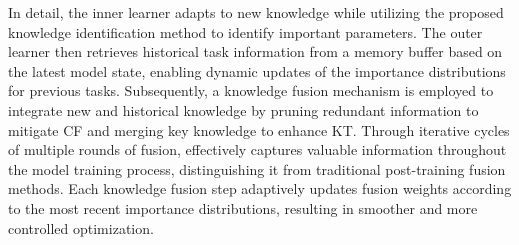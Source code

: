 

In detail, the inner learner adapts to new knowledge while utilizing the proposed knowledge identification method to identify important parameters. The outer learner then retrieves historical task information from a memory buffer based on the latest model state, enabling dynamic updates of the importance distributions for previous tasks. Subsequently, a knowledge fusion mechanism is employed to integrate new and historical knowledge by pruning redundant information to mitigate CF and merging key knowledge to enhance KT.
Through iterative cycles of multiple rounds of fusion, {\ouralg} effectively captures valuable information throughout the model training process, distinguishing it from traditional post-training fusion methods. Each knowledge fusion step adaptively updates fusion weights according to the most recent importance distributions, resulting in smoother and more controlled optimization.



